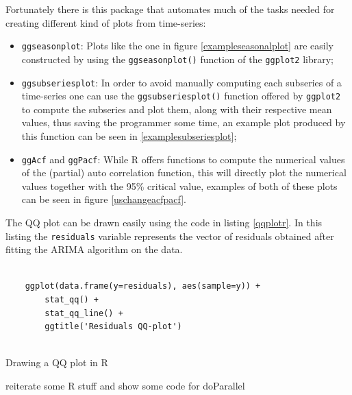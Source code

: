 \documentclass[12pt,a4paper,titlepage]{report}
\begin{document}
Fortunately there is this package that automates much of the tasks needed for creating different kind of plots from time-series:

\begin{itemize}
    \item \texttt{ggseasonplot}: Plots like the one in figure \ref{exampleseasonalplot} are easily constructed by using the \texttt{ggseasonplot()} function of the \texttt{ggplot2} library;
    \item \texttt{ggsubseriesplot}: In order to avoid manually computing each subseries of a time-series one can use the \texttt{ggsubseriesplot()} function offered by \texttt{ggplot2} to compute the subseries and plot them, along with their respective mean values, thus saving the programmer some time, an example plot produced by this function can be seen in \ref{examplesubseriesplot};
    \item \texttt{ggAcf} and \texttt{ggPacf}: While R offers functions to compute the numerical values of the (partial) auto correlation function, this will directly plot the numerical values together with the 95\% critical value, examples of both of these plots can be seen in figure \ref{uschangeacfpacf}.
\end{itemize}

The QQ plot can be drawn easily using the code in listing \ref{qqplotr}. In this listing the \texttt{residuals} variable represents the vector of residuals obtained after fitting the ARIMA algorithm on the data.

\begin{listing}[h]
    \begin{verbatim}
    
    ggplot(data.frame(y=residuals), aes(sample=y)) +
        stat_qq() +
        stat_qq_line() +
        ggtitle('Residuals QQ-plot')
    
    \end{verbatim}
    
    \caption{Drawing a QQ plot in R}
    \label{qqplotr}
\end{listing}

reiterate some R stuff and show some code for doParallel
\end{document}
